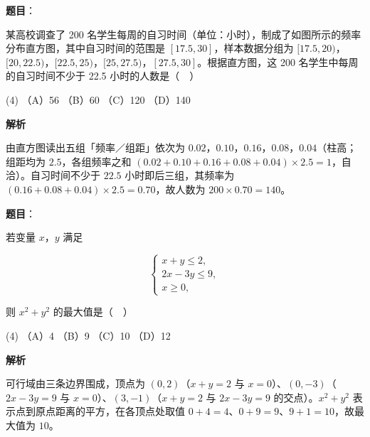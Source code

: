 \begin{answer}

\textbf{题目}：

某高校调查了 200 名学生每周的自习时间（单位：小时），制成了如图所示的频率分布直方图，其中自习时间的范围是 \([17.5,30]\)，样本数据分组为 \([17.5,20)\)，\([20,22.5)\)，\([22.5,25)\)，\([25,27.5)\)，\([27.5,30]\)。根据直方图，这 200 名学生中每周的自习时间不少于 22.5 小时的人数是（　）
\nopagebreak[4]
\begin{center}\end{center}
\nopagebreak[4]
\begin{gkopts}(4)
\task （A）56
\task （B）60
\task （C）120
\task （D）140
\end{gkopts}

\textbf{解析}

由直方图读出五组「频率／组距」依次为 \(0.02\)，\(0.10\)，\(0.16\)，\(0.08\)，\(0.04\)（柱高；组距均为 \(2.5\)，各组频率之和 \((0.02+0.10+0.16+0.08+0.04)\times 2.5=1\)，自洽）。自习时间不少于 \(22.5\) 小时即后三组，其频率为 \((0.16+0.08+0.04)\times 2.5=0.70\)，故人数为 \(200\times 0.70=140\)。


\end{answer}
\begin{answer}

\textbf{题目}：

若变量 \(x\)，\(y\) 满足

\nopagebreak[4]
\[
\begin{cases}
x+y\leqslant 2,\\
2x-3y\leqslant 9,\\
x\geqslant 0,
\end{cases}
\]

则 \(x^2+y^2\) 的最大值是（　）

\begin{gkopts}(4)
\task （A）4
\task （B）9
\task （C）10
\task （D）12
\end{gkopts}

\textbf{解析}

可行域由三条边界围成，顶点为 \((0,2)\)（\(x+y=2\) 与 \(x=0\)）、\((0,-3)\)（\(2x-3y=9\) 与 \(x=0\)）、\((3,-1)\)（\(x+y=2\) 与 \(2x-3y=9\) 的交点）。\(x^{2}+y^{2}\) 表示点到原点距离的平方，在各顶点处取值 \(0+4=4\)、\(0+9=9\)、\(9+1=10\)，故最大值为 \(10\)。


\end{answer}

